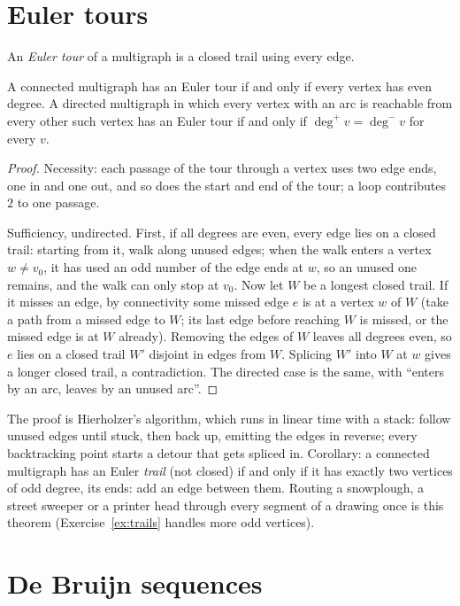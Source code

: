 \section{Euler tours}

An \emph{Euler tour} of a multigraph is a closed trail using every edge.

\begin{theorem}\label{thm:euler}
A connected multigraph has an Euler tour if and only if every vertex has even degree. A directed multigraph in which
every vertex with an arc is reachable from every other such vertex has an Euler tour if and only if $\deg^+v=\deg^-v$ for every $v$.
\end{theorem}
\begin{proof}
Necessity: each passage of the tour through a vertex uses two edge ends, one in and one out, and so does the start and
end of the tour; a loop contributes $2$ to one passage.

Sufficiency, undirected. First, if all degrees are even, every edge lies on a closed trail: starting from it, walk along unused
edges; when the walk enters a vertex $w\ne v_0$, it has used an odd number of the edge ends at $w$, so an unused one remains, and the
walk can only stop at $v_0$. Now let $W$ be a longest closed trail. If it misses an edge, by connectivity some missed edge $e$ is at a vertex
$w$ of $W$ (take a path from a missed edge to $W$; its last edge before reaching $W$ is missed, or the missed edge is at $W$ already).
Removing the edges of $W$ leaves all degrees even, so $e$ lies on a closed trail $W'$ disjoint in edges from $W$. Splicing $W'$ into $W$ at
$w$ gives a longer closed trail, a contradiction. The directed case is the same, with ``enters by an arc, leaves by an unused arc''.
\end{proof}

The proof is Hierholzer's algorithm, which runs in linear time with a stack: follow unused edges until stuck, then back up,
emitting the edges in reverse; every backtracking point starts a detour that gets spliced in. Corollary: a connected multigraph
has an Euler \emph{trail} (not closed) if and only if it has exactly two vertices of odd degree, its ends: add an edge between them.
Routing a snowplough, a street sweeper or a printer head through every segment of a drawing once is this theorem
(Exercise~\ref{ex:trails} handles more odd vertices).

\section{De Bruijn sequences}

